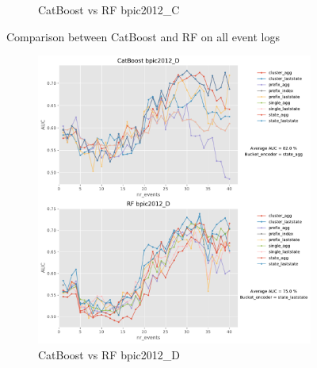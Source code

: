 \documentclass[twoside,11pt]{Latex/Classes/PhDthesisPSnPDF}
\begin{document}
\begin{figure}[t!]
\begin{subfigure}{0.48\textwidth}
		\caption{CatBoost vs RF bpic2012\_C} \label{fig:b12ccr}
	\end{subfigure}
	\caption{Comparison between CatBoost and RF on all event logs}
\label{fig:r1cr}
\end{figure}



\begin{figure}[t!] %
		
	\begin{subfigure}{0.48\textwidth}
		\includegraphics[width=\linewidth]{images/catboost/graphsrf/bpic2012_D_CatBoost_rf.pdf}
		\caption{CatBoost vs RF bpic2012\_D} \label{fig:b12dcr}
	\end{subfigure}\hspace*{\fill}
	\begin{subfigure}{0.48\textwidth}

\end{subfigure}
\end{figure}
\end{document}
